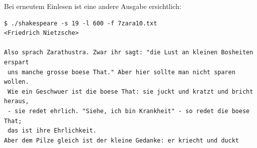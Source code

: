 \documentclass[10pt,a4paper]{article}
\begin{document}
\begin{spacing}{1}
Bei erneutem Einlesen ist eine andere Ausgabe ersichtlich:
\begin{lstlisting}
$ ./shakespeare -s 19 -l 600 -f 7zara10.txt
<Friedrich Nietzsche>

Also sprach Zarathustra. Zwar ihr sagt: "die Lust an kleinen Bosheiten erspart
 uns manche grosse boese That." Aber hier sollte man nicht sparen wollen.
 Wie ein Geschwuer ist die boese That: sie juckt und kratzt und bricht heraus,
 - sie redet ehrlich. "Siehe, ich bin Krankheit" - so redet die boese That;
 das ist ihre Ehrlichkeit. 
Aber dem Pilze gleich ist der kleine Gedanke: er kriecht und duckt
\end{lstlisting}


\end{spacing}
\end{document}
